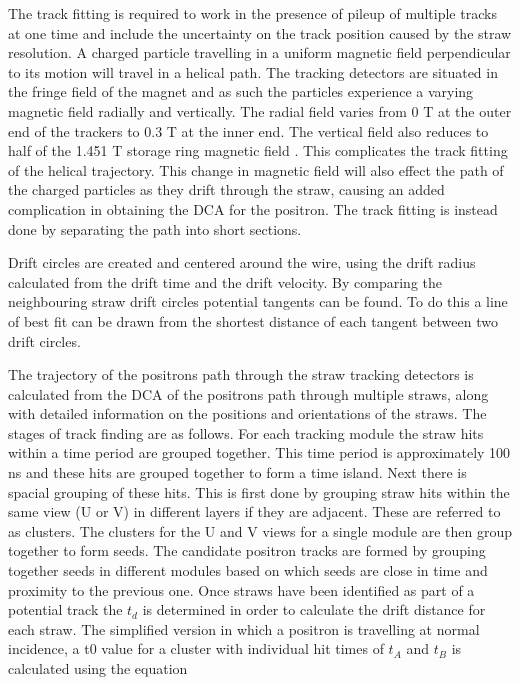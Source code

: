 The track fitting is required to work in the presence of pileup of multiple tracks at one time and include the uncertainty on the track position caused by the straw resolution. A charged particle travelling in a uniform magnetic field perpendicular to its motion will travel in a helical path. The tracking detectors are situated in the fringe field of the magnet and as such the particles experience a varying magnetic field radially and vertically. The radial field varies from 0 T at the outer end of the trackers to 0.3 T at the inner end. The vertical field also reduces to half of the 1.451 T storage ring magnetic field \cite{geanefitting}. This complicates the track fitting of the helical trajectory. This change in magnetic field will also effect the path of the charged particles as they drift through the straw, causing an added complication in obtaining the DCA for the positron. The track fitting is instead done by separating the path into short sections. 

Drift circles are created and centered around the wire, using the drift radius calculated from the drift time and the drift velocity. By comparing the neighbouring straw drift circles potential tangents can be found. To do this a line of best fit can be drawn from the shortest distance of each tangent between two drift circles.

The trajectory of the positrons path through the straw tracking detectors is calculated from the DCA of the positrons path through multiple straws, along with detailed information on the positions and orientations of the straws. The stages of track finding are as follows. For each tracking module the straw hits within a time period are grouped together. This time period is approximately 100 ns and these hits are grouped together to form a time island. Next there is spacial grouping of these hits. This is first done by grouping straw hits within the same view (U or V) in different layers if they are adjacent. These are referred to as clusters. The clusters for the U and V views for a single module are then group together to form seeds. The candidate positron tracks are formed by grouping together seeds in different modules based on which seeds are close in time and proximity to the previous one. Once straws have been identified as part of a potential track the $t_{d}$ is determined in order to calculate the drift distance for each straw. The simplified version in which a positron is travelling at normal incidence, a t0 value for a cluster with individual hit times of $t_A$ and $t_B$ is calculated using the equation

